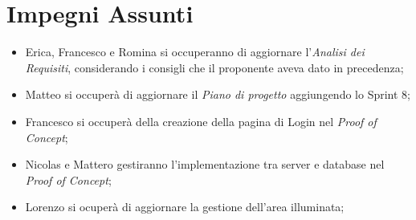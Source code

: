 \documentclass[a4paper, 12pt]{article}
\begin{document}
\section*{Impegni Assunti}
\begin{itemize}
    \item Erica, Francesco e Romina si occuperanno di aggiornare l'\textit{Analisi dei Requisiti}, considerando i consigli che il proponente aveva dato in precedenza;
    \item Matteo si occuperà di aggiornare il \textit{Piano di progetto} aggiungendo lo Sprint 8;
    \item Francesco si occuperà della creazione della pagina di Login nel \textit{Proof of Concept};
    \item Nicolas e Mattero gestiranno l'implementazione tra server e database nel \textit{Proof of Concept};
    \item Lorenzo si ocuperà di aggiornare la gestione dell'area illuminata;
\end{itemize}
\end{document}
